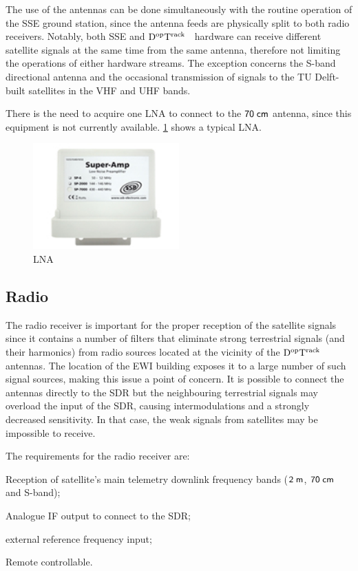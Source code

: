 \documentclass[11pt,a4paper,oneside]{article}
\newcommand{\GroundStationName}{${\rm D^{\rm op}T^{\rm rack}}$}
\newcommand{\halftextwidth}{0.5\textwidth}
\newcommand{\listskip}{0pt}
\newenvironment{itemize*}
{\begin{itemize}
  \setlength{\itemsep}{\listskip}
  \setlength{\parskip}{\listskip}
  \setlength{\parsep}{\listskip}}
{\end{itemize}}
\newcommand{\unit}[2]{$ {\sf #1}\thickspace{\sf #2}$}
\begin{document}
The use of the antennas can be done simultaneously with the routine operation of the \ac{SSE} ground station, since the antenna feeds are physically split to both radio receivers. Notably, both \ac{SSE} and \GroundStationName~ hardware can receive different satellite signals at the same time from the same antenna, therefore not limiting the operations of either hardware streams. The exception concerns the S-band directional antenna and the occasional transmission of signals to the TU Delft-built satellites in the \ac{VHF} and \ac{UHF} bands.

There is the need to acquire one \ac{LNA} to connect to the \unit{70}{cm} antenna, since this equipment is not currently available. \ref{fig:lna} shows a typical \ac{LNA}.

\begin{figure}[!ht]
\centering
\includegraphics[width=\halftextwidth]{LNA}
\caption{\acl{LNA}}
\label{fig:lna}
\end{figure}



\subsection{Radio}

The radio receiver is important for the proper reception of the satellite signals since it contains a number of filters that eliminate strong terrestrial signals (and their harmonics) from radio sources located at the vicinity of the \GroundStationName~ antennas. The location of the \ac{EWI} building exposes it to a large number of such signal sources, making this issue a point of concern. It is possible to connect the antennas directly to the \ac{SDR} but the neighbouring terrestrial signals may overload the input of the \ac{SDR}, causing intermodulations and a strongly decreased sensitivity. In that case, the weak signals from satellites may be impossible to receive.

The requirements for the radio receiver are:

\begin{itemize*}
\item Reception of satellite's main telemetry downlink frequency bands (\unit{2}{m}, \unit{70}{cm} and S-band);
\item Analogue \ac{IF} output to connect to the \ac{SDR};
\item external reference frequency input;
\item Remote controllable.
\end{itemize*}
\end{document}
